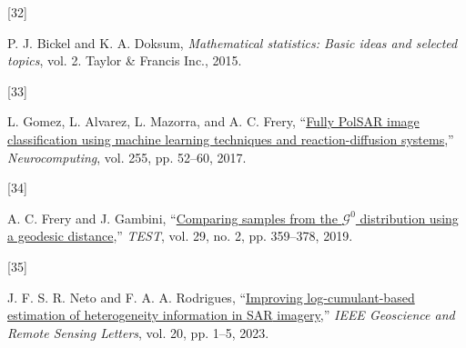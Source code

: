 \documentclass[
  lettersize  journal,
]{IEEEtran}%
\newlength{\cslhangindent}
\newlength{\csllabelwidth}
\newenvironment{CSLReferences}[2] %
 {\begin{list}{}{%
  \setlength{\itemindent}{0pt}
  \setlength{\leftmargin}{0pt}
  \setlength{\parsep}{0pt}
  \ifodd #1
   \setlength{\leftmargin}{\cslhangindent}
   \setlength{\itemindent}{-1\cslhangindent}
  \fi
  \setlength{\itemsep}{#2\baselineskip}}}
 {\end{list}}
\newcommand{\CSLLeftMargin}[1]{\parbox[t]{\csllabelwidth}{\strut#1\strut}}
\newcommand{\CSLRightInline}[1]{\parbox[t]{\linewidth - \csllabelwidth}{\strut#1\strut}}
\providecommand{\bibfont}{\footnotesize}
\begin{document}
\begin{CSLReferences}{0}{0}
\CSLLeftMargin{{[}32{]} }%
\CSLRightInline{P. J. Bickel and K. A. Doksum, \emph{Mathematical
statistics: Basic ideas and selected topics}, vol. 2. Taylor \& Francis
Inc., 2015. }

\CSLLeftMargin{{[}33{]} }%
\CSLRightInline{L. Gomez, L. Alvarez, L. Mazorra, and A. C. Frery,
{``\href{https://doi.org/10.1016/j.neucom.2016.08.140}{Fully PolSAR
image classification using machine learning techniques and
reaction-diffusion systems},''} \emph{Neurocomputing}, vol. 255, pp.
52--60, 2017. }

\CSLLeftMargin{{[}34{]} }%
\CSLRightInline{A. C. Frery and J. Gambini,
{``\href{https://doi.org/10.1007/s11749-019-00658-2}{Comparing samples
from the \({\mathcal {G}}^0\) distribution using a geodesic
distance},''} \emph{TEST}, vol. 29, no. 2, pp. 359--378, 2019. }

\CSLLeftMargin{{[}35{]} }%
\CSLRightInline{J. F. S. R. Neto and F. A. A. Rodrigues,
{``\href{https://doi.org/10.1109/lgrs.2023.3305119}{Improving
log-cumulant-based estimation of heterogeneity information in {SAR}
imagery},''} \emph{{IEEE} Geoscience and Remote Sensing Letters}, vol.
20, pp. 1--5, 2023. }

\end{CSLReferences}


\ifCLASSOPTIONcaptionsoff
  \newpage
\fi



\pagebreak[3]
\end{document}
